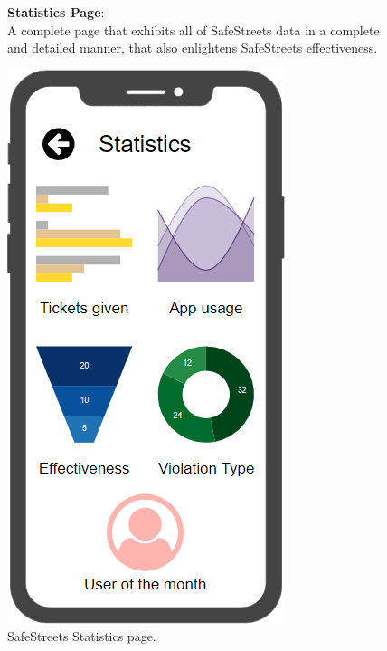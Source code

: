 \begin{figure}
	\begin{flushleft}
		\textbf{Statistics Page}:\\
		A complete page that exhibits all of SafeStreets data in a complete and detailed manner, that also enlightens SafeStreets effectiveness. 
	\end{flushleft}
	\centering
	\includegraphics[width=0.6\linewidth]{images/mockups/statistics}
	\caption{SafeStreets Statistics page.}
	\label{fig:statistics}
\end{figure}
\clearpage
